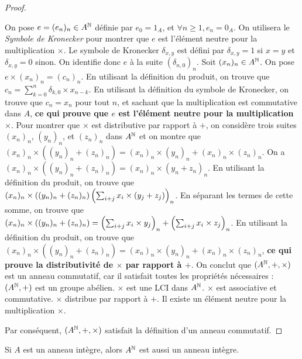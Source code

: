 \documentclass[12pt, a4paper]{report}
\begin{document}
\begin{proof}
\begin{outline}
            \2 On pose $e = (e_n)_n \in A^{\mathbb{N}}$ définie par $e_0 = 1_A$, et $\forall n \ge 1, e_n = 0_A$.
            \2 On utilisera le \textit{Symbole de Kronecker} pour montrer que $e$ est l'élément neutre pour la multiplication $\times$.
            \3 Le symbole de Kronecker $\delta_{x,y}$ est défini par $\delta_{x,y} = 1$ si $x=y$ et $\delta_{x,y} = 0$ sinon.
            \2 On identifie donc $e$ à la suite $(\delta_{n,0})_n$.
            \2 Soit $(x_n)_n \in A^{\mathbb{N}}$. On pose $e\times (x_n)_n = (c_n)_n$.
            \2 En utilisant la définition du produit, on trouve que $c_n = \sum_{k=0}^n \delta_{k,0} \times x_{n-k}$.
            \2 En utilisant la définition du symbole de Kronecker, on trouve que $c_n = x_n$ pour tout $n$, et sachant que la multiplication est commutative dans $A$, \textbf{ce qui prouve que $e$ est l'élément neutre pour la multiplication $\times$}.
        \1 Pour montrer que $\times$ est distributive par rapport à $+$, on considère trois suites $(x_n)_n$, $(y_n)_n$, et $(z_n)_n$ dans $A^{\mathbb{N}}$ et on montre que $(x_n)_n \times ((y_n)_n + (z_n)_n) = (x_n)_n \times (y_n)_n + (x_n)_n \times (z_n)_n$.
            \2 On a $(x_n)_n \times ((y_n)_n + (z_n)_n) = (x_n)_n \times (y_n+z_n)_n$.
            \2 En utilisant la définition du produit, on trouve que $(x_n)_n \times ((y_n)_n + (z_n)_n)\left(\sum_{i+j} x_i \times (y_j + z_j)\right)_n$.
            \2 En séparant les termes de cette somme, on trouve que $(x_n)_n \times ((y_n)_n + (z_n)_n) = \left(\sum_{i+j} x_i \times y_j\right)_n + \left(\sum_{i+j} x_i \times z_j\right)_n$.
            \2 En utilisant la définition du produit, on trouve que $(x_n)_n \times ((y_n)_n + (z_n)_n) = (x_n)_n \times (y_n)_n + (x_n)_n \times (z_n)_n$, \textbf{ce qui prouve la distributivité de $\times$ par rapport à $+$}.
        \1 On conclut que $(A^{\mathbb{N}}, +, \times)$ est un anneau commutatif, car il satisfait toutes les propriétés nécessaires : 
            \2 $(A^{\mathbb{N}}, +)$ est un groupe abélien.
            \2 $\times$ est une LCI dans $A^{\mathbb{N}}$.
            \2 $\times$ est associative et commutative.
            \2 $\times$ distribue par rapport à $+$.
            \2 Il existe un élément neutre pour la multiplication $\times$.
    \end{outline}
    
    Par conséquent, $(A^{\mathbb{N}}, +, \times)$ satisfait la définition d'un anneau commutatif.
\end{proof}

\begin{property}
    Si $A$ est un anneau intègre, alors $A^{\mathbb{N}}$ est aussi un anneau intègre.
\end{property}
\end{document}
